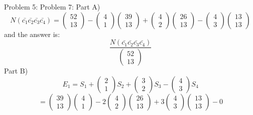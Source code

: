\documentclass{article}
\begin{document}
Problem 5:
\newline
Problem 7: Part A)
$$
N(\bar{c_1}\bar{c_2}\bar{c_3}\bar{c_4})
=
\left(\begin{array}{c}
52\\
13
\end{array}\right)
-
\left(\begin{array}{c}
4\\
1
\end{array}\right)
\left(\begin{array}{c}
39\\
13
\end{array}\right)
+
\left(\begin{array}{c}
4\\
2
\end{array}\right)
\left(\begin{array}{c}
26\\
13
\end{array}\right)
-
\left(\begin{array}{c}
4\\
3
\end{array}\right)
\left(\begin{array}{c}
13\\
13
\end{array}\right)
$$
and the answer is:
$$
\frac{N(\bar{c_1}\bar{c_2}\bar{c_3}\bar{c_4})
}{\left(\begin{array}{c}
52\\
13
\end{array}\right)
}
$$
Part B)
$$
E_1=S_1
+
\left(\begin{array}{c}
2\\
1
\end{array}\right)
S_2
+
\left(\begin{array}{c}
3\\
2
\end{array}\right)
S_3
-
\left(\begin{array}{c}
4\\
3
\end{array}\right)
S_4
$$
$$
=
\left(\begin{array}{c}
39\\
13
\end{array}\right)
\left(\begin{array}{c}
4\\
1
\end{array}\right)
-
2
\left(\begin{array}{c}
4\\
2
\end{array}\right)
\left(\begin{array}{c}
26\\
13
\end{array}\right)
+
3
\left(\begin{array}{c}
4\\
3
\end{array}\right)
\left(\begin{array}{c}
13\\
13
\end{array}\right)
-0
$$
\end{document}
